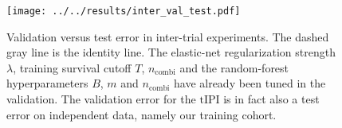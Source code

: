 \begin{figure}
    \centering
    \texttt{[image: ../../results/inter\_val\_test.pdf]}
    \caption{Validation versus test error in inter-trial experiments. The dashed gray line is the 
        identity line. The elastic-net regularization strength $\lambda$, training survival cutoff 
        $T$, $n_\text{combi}$ and the random-forest hyperparameters $B$, $m$ and $n_\text{combi}$ 
        have already been tuned in the validation. The validation error for the $\text{tIPI}$ is in 
        fact also a test error on independent data, namely our training cohort.}
    \label{fig:inter-val-test}
\end{figure}